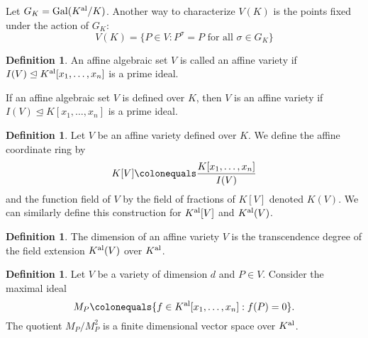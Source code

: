 \documentclass{dcthesis}
\newcommand{\defi}[1]{\textsf{#1}}
\newcommand{\Kal}{{{K}^{\textup{al}}}}
\DeclareMathOperator{\Gal}{Gal}
\theoremstyle{definition}
\newtheorem{definition}[prop]{Definition}
\theoremstyle{remark}
\numberwithin{equation}{section}
\numberwithin{figure}{section}
\begin{document}
{{    Let $G_K = \Gal(\Kal/K)$.
    Another way to characterize $V(K)$ is
    the points fixed under the action of $G_K$:
    \begin{equation}
      \label{eqn:galoisactiononV}
      V(K) =
      \{P\in V : P^\sigma = P\text{ for all }\sigma\in G_K\}
    \end{equation}
    \begin{definition}
      \label{def:affinevariety}
      An affine algebraic set $V$ is called
      an \defi{affine variety}
      if $I(V)\trianglelefteq\Kal[x_1,\dots,x_n]$ is a prime ideal.
    \end{definition}
    If an affine algebraic set $V$ is defined over $K$,
    then $V$ is an affine variety if
    $I(V)\trianglelefteq K[x_1,\dots,x_n]$
    is a prime ideal.
    \begin{definition}
      \label{def:coordinateringfunctionfield}
      Let $V$ be an affine variety defined over $K$.
      We define the
      \defi{affine coordinate ring}
      by
      \[
        K[V]
        \colonequals
        \frac{
          K[x_1,\dots,x_n]
        }{
        I(V)
        }
      \]
      and the
      \defi{function field of $V$}
      by the field of fractions of $K[V]$
      denoted $K(V)$.
      We can similarly define this construction
      for $\Kal[V]$ and $\Kal(V)$.
    \end{definition}
    \begin{definition}
      \label{def:dimension}
      The \defi{dimension}
      of an affine variety $V$
      is the transcendence degree of the field extension
      $\Kal(V)$ over $\Kal$.
    \end{definition}
    \begin{definition}
      \label{def:nonsingular}
      Let $V$ be a variety of dimension $d$
      and $P\in V$.
      Consider the maximal ideal
      \[
        M_P\colonequals
        \{f\in\Kal[x_1,\dots,x_n]:f(P)=0\}.
      \]
      The quotient $M_P/M_P^2$ is a finite dimensional
      vector space over $\Kal$.

\end{definition}}}
\end{document}
